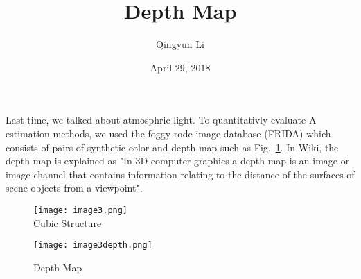 \documentclass{article}
\author{Qingyun Li}
\date{April 29, 2018}
\title{Depth Map}
\begin{document}
\maketitle
 \par Last time, we talked about atmosphric light. To quantitativly evaluate A estimation methods, we used the foggy rode image database (FRIDA) \cite{Tripathi2012Removal} which consists of pairs of synthetic color and depth map such as Fig.~\ref{depth map}. In Wiki, the depth map is explained as "In 3D computer graphics a depth map is an image or image channel that contains information relating to the distance of the surfaces of scene objects from a viewpoint". 
\begin{figure}[htbp]
\begin{minipage}{0.5\linewidth}
\texttt{[image: image3.png]}\\
\caption{Cubic Structure}\label{original image} 
\end{minipage}
\hfill
\begin{minipage}{0.5\linewidth}
\texttt{[image: image3depth.png]}\\
\caption{Depth Map}\label{depth map}
\end{minipage} 
\end{figure}


\end{document}
